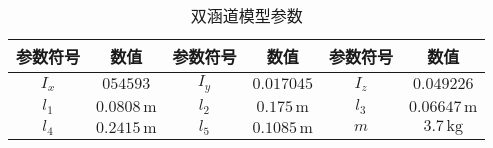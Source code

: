 \begin{table}
	\caption{\label{TDF_para2}双涵道模型参数}
	\centering{}%
	\small 
	\begin{tabular}{cccccc}
		\hline 
		参数符号 & 数值&参数符号 & 数值&参数符号 & 数值\tabularnewline
		\hline 
		$ I_x $ & $ 054593 $ &$ I_y $ & $ 0.017045 $& $ I_z$ & $ 0.049226 $ \tabularnewline
		$ l_{1} $ & $ 0.0808\,\text{m} $&$ l_{2} $ & $ 0.175\,\text{m} $ &$ l_3 $ & $ 0.06647\,\text{m} $ \tabularnewline 
		$ l_4 $ & $ 0.2415\,\text{m} $ &$ l_5 $ & $ 0.1085\,\text{m} $& $ m $ & $ 3.7\,\text{kg} $ \tabularnewline
		\hline 
	\end{tabular}	%
\end{table}